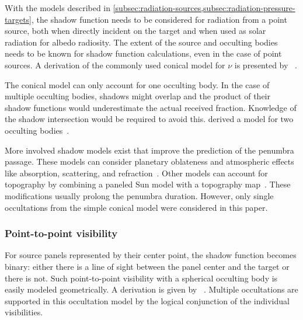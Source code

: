 With the models described in \cref{subsec:radiation-sources,subsec:radiation-pressure-targets}, the shadow function needs to be considered for radiation from a point source, both when directly incident on the target and when used as solar radiation for albedo radiosity. The extent of the source and occulting bodies needs to be known for shadow function calculations, even in the case of point sources. A derivation of the commonly used conical model for $\nu$ is presented by \citeauthor{Montenbruck2000}~\cite{Montenbruck2000}.

The conical model can only account for one occulting body. In the case of multiple occulting bodies, shadows might overlap and the product of their shadow functions would underestimate the actual received fraction. Knowledge of the shadow intersection would be required to avoid this. \citeauthor{Zhang2019} derived a model for two occulting bodies~\cite{Zhang2019}.

More involved shadow models exist that improve the prediction of the penumbra passage. These models can consider planetary oblateness and atmospheric effects like absorption, scattering, and refraction~\cite{Li2019}. Other models can account for topography by combining a paneled Sun model with a topography map~\cite{Mazarico2018}. These modifications usually prolong the penumbra duration. However, only single occultations from the simple conical model were considered in this paper.


\subsubsection{Point-to-point visibility}
For source panels represented by their center point, the shadow function becomes binary: either there is a line of sight between the panel center and the target or there is not. Such point-to-point visibility with a spherical occulting body is easily modeled geometrically. A derivation is given by \citeauthor{Vallado2013}~\cite{Vallado2013}. Multiple occultations are supported in this occultation model by the logical conjunction of the individual visibilities.
